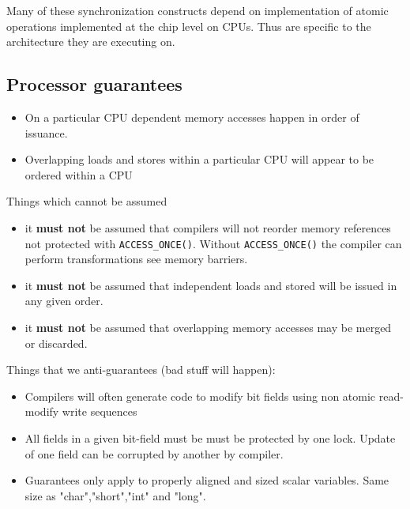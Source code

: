 \documentclass{article}
\begin{document}
Many of these synchronization constructs depend on implementation of
atomic operations implemented at the chip level on CPUs. Thus are
specific to the architecture they are executing on.

\subsection{Processor guarantees}

\begin{itemize}
  \item On a particular CPU dependent memory accesses happen in order
    of issuance.

  \item Overlapping loads and stores within a particular CPU will
    appear to be ordered within a CPU
    
\end{itemize}

Things which cannot be assumed

\begin{itemize}
\item it \textbf{must not} be assumed that compilers will not reorder
  memory references not protected with \lstinline{ACCESS_ONCE()}. Without
  \lstinline{ACCESS_ONCE()} the compiler can perform transformations see memory
  barriers.
\item it \textbf{must not} be assumed that independent loads and
  stored will be issued in any given order.
\item it \textbf{must not} be assumed that overlapping memory accesses
  may be merged or discarded.  
\end{itemize}

Things that we anti-guarantees (bad stuff will happen):

\begin{itemize}

\item Compilers will often generate code to modify bit fields using non
  atomic read-modify write sequences

\item All fields in a given bit-field must be must be protected by one
  lock. Update of one field can be corrupted by another by compiler.
  
\item Guarantees only apply to properly aligned and sized scalar
  variables. Same size as "char","short","int" and "long".  
\end{itemize}
\end{document}
